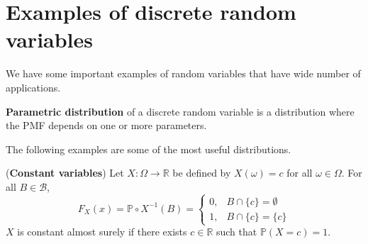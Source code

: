 \documentclass{huhtakm-template-book}
\newcommand{\prob}{\mathbb{P}}
\begin{document}
\section{Examples of discrete random variables}
We have some important examples of random variables that have wide number of applications.
\begin{defn}
	\textbf{Parametric distribution} of a discrete random variable is a distribution where the PMF depends on one or more parameters.
\end{defn}
The following examples are some of the most useful distributions.
\begin{eg}(\textbf{Constant variables})
	Let $X:\Omega\to\mathbb{R}$ be defined by $X(\omega)=c$ for all $\omega\in\Omega$. For all $B\in\mathcal{B}$,
	\begin{equation*}
		F_{X}(x)=\prob\circ X^{-1}(B)=\begin{cases}
			0, &B\cap\{c\}=\emptyset\\
			1, &B\cap\{c\}=\{c\}
		\end{cases}
	\end{equation*}
	$X$ is constant almost surely if there exists $c\in\mathbb{R}$ such that $\prob(X=c)=1$.
\end{eg}
\end{document}
